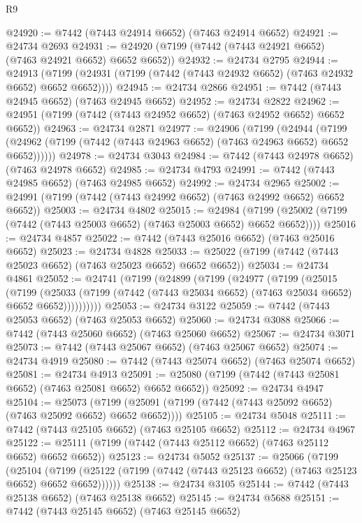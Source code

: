 \begin{lexlean}{R9}
\begin{coremodule}
@24920 := @7442 (@7443 @24914 @6652) (@7463 @24914 @6652)
@24921 := @24734 @2693
@24931 := @24920 (@7199 (@7442 (@7443 @24921 @6652) (@7463 @24921 @6652) @6652 @6652))
@24932 := @24734 @2795
@24944 := @24913
    (@7199 (@24931 (@7199 (@7442 (@7443 @24932 @6652) (@7463 @24932 @6652) @6652 @6652))))
@24945 := @24734 @2866
@24951 := @7442 (@7443 @24945 @6652) (@7463 @24945 @6652)
@24952 := @24734 @2822
@24962 := @24951 (@7199 (@7442 (@7443 @24952 @6652) (@7463 @24952 @6652) @6652 @6652))
@24963 := @24734 @2871
@24977 := @24906
    (@7199
      (@24944
        (@7199 (@24962 (@7199 (@7442 (@7443 @24963 @6652) (@7463 @24963 @6652) @6652 @6652))))))
@24978 := @24734 @3043
@24984 := @7442 (@7443 @24978 @6652) (@7463 @24978 @6652)
@24985 := @24734 @4793
@24991 := @7442 (@7443 @24985 @6652) (@7463 @24985 @6652)
@24992 := @24734 @2965
@25002 := @24991 (@7199 (@7442 (@7443 @24992 @6652) (@7463 @24992 @6652) @6652 @6652))
@25003 := @24734 @4802
@25015 := @24984
    (@7199 (@25002 (@7199 (@7442 (@7443 @25003 @6652) (@7463 @25003 @6652) @6652 @6652))))
@25016 := @24734 @4857
@25022 := @7442 (@7443 @25016 @6652) (@7463 @25016 @6652)
@25023 := @24734 @4828
@25033 := @25022 (@7199 (@7442 (@7443 @25023 @6652) (@7463 @25023 @6652) @6652 @6652))
@25034 := @24734 @4861
@25052 := @24741
    (@7199
      (@24899
        (@7199
          (@24977
            (@7199
              (@25015
                (@7199
                  (@25033
                    (@7199 (@7442 (@7443 @25034 @6652) (@7463 @25034 @6652) @6652 @6652))))))))))
@25053 := @24734 @3122
@25059 := @7442 (@7443 @25053 @6652) (@7463 @25053 @6652)
@25060 := @24734 @3088
@25066 := @7442 (@7443 @25060 @6652) (@7463 @25060 @6652)
@25067 := @24734 @3071
@25073 := @7442 (@7443 @25067 @6652) (@7463 @25067 @6652)
@25074 := @24734 @4919
@25080 := @7442 (@7443 @25074 @6652) (@7463 @25074 @6652)
@25081 := @24734 @4913
@25091 := @25080 (@7199 (@7442 (@7443 @25081 @6652) (@7463 @25081 @6652) @6652 @6652))
@25092 := @24734 @4947
@25104 := @25073
    (@7199 (@25091 (@7199 (@7442 (@7443 @25092 @6652) (@7463 @25092 @6652) @6652 @6652))))
@25105 := @24734 @5048
@25111 := @7442 (@7443 @25105 @6652) (@7463 @25105 @6652)
@25112 := @24734 @4967
@25122 := @25111 (@7199 (@7442 (@7443 @25112 @6652) (@7463 @25112 @6652) @6652 @6652))
@25123 := @24734 @5052
@25137 := @25066
    (@7199
      (@25104
        (@7199 (@25122 (@7199 (@7442 (@7443 @25123 @6652) (@7463 @25123 @6652) @6652 @6652))))))
@25138 := @24734 @3105
@25144 := @7442 (@7443 @25138 @6652) (@7463 @25138 @6652)
@25145 := @24734 @5688
@25151 := @7442 (@7443 @25145 @6652) (@7463 @25145 @6652)

\end{coremodule}
\end{lexlean}
